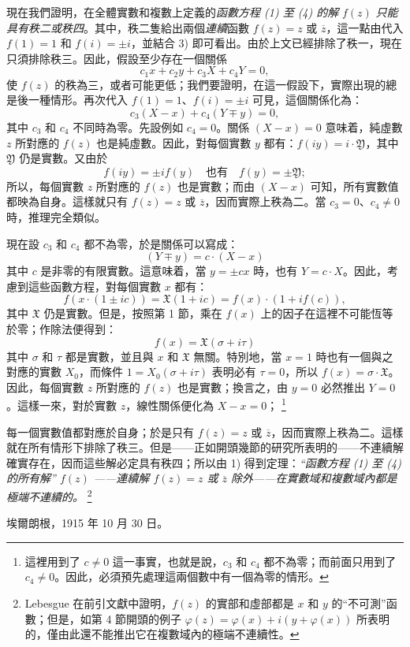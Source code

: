 \documentclass[11pt]{article}
\providecommand{\qtext}[1]{“#1”}
\providecommand{\Xreal}{\mathfrak X}
\providecommand{\Yreal}{\mathfrak Y}
\providecommand{\srcfn}[2]{%
  \begingroup\renewcommand{\thefootnote}{#1}\footnote{#2}\addtocounter{footnote}{-1}\endgroup}
\begin{document}
現在我們證明，在全體實數和複數上定義的\emph{函數方程 (1) 至 (4) 的解} \(f(z)\) \emph{只能具有秩二或秩四}。其中，秩二隻給出兩個\emph{連續}函數 \(f(z)=z\) 或 \(\overline z\)，這一點由代入 \(f(1)=1\) 和 \(f(i)=\pm i\)，並結合 3) 即可看出。由於上文已經排除了秩一，現在只須排除秩三。因此，假設至少存在一個關係
\[
c_1x+c_2y+c_3X+c_4Y=0,
\]
使 \(f(z)\) 的秩為三，或者可能更低；我們要證明，在這一假設下，實際出現的總是後一種情形。再次代入 \(f(1)=1\)、\(f(i)=\pm i\) 可見，這個關係化為：
\[
c_3(X-x)+c_4(Y\mp y)=0,
\]
其中 \(c_3\) 和 \(c_4\) 不同時為零。先設例如 \(c_4=0\)。關係 \((X-x)=0\) 意味着，純虛數 \(z\) 所對應的 \(f(z)\) 也是純虛數。因此，對每個實數 \(y\) 都有：\(f(iy)=i\cdot\Yreal\)，其中 \(\Yreal\) 仍是實數。又由於
\[
f(iy)=\pm i f(y)\quad\text{也有}\quad f(y)=\pm\Yreal;
\]
所以，每個實數 \(z\) 所對應的 \(f(z)\) 也是實數；而由 \((X-x)\) 可知，所有實數值都映為自身。這樣就只有 \(f(z)=z\) 或 \(\overline z\)，因而實際上秩為二。當 \(c_3=0\)、\(c_4\ne0\) 時，推理完全類似。

現在設 \(c_3\) 和 \(c_4\) 都不為零，於是關係可以寫成：
\[
(Y\mp y)=c\cdot(X-x)
\]
其中 \(c\) 是非零的有限實數。這意味着，當 \(y=\pm cx\) 時，也有 \(Y=c\cdot X\)。因此，考慮到這些函數方程，對每個實數 \(x\) 都有：
\[
f(x\cdot(1\pm ic))=\Xreal(1+ic)=f(x)\cdot(1+i f(c)),
\]
其中 \(\Xreal\) 仍是實數。但是，按照第 1 節，乘在 \(f(x)\) 上的因子在這裡不可能恆等於零；作除法便得到：
\[
f(x)=\Xreal(\sigma+i\tau)
\]
其中 \(\sigma\) 和 \(\tau\) 都是實數，並且與 \(x\) 和 \(\Xreal\) 無關。特別地，當 \(x=1\) 時也有一個與之對應的實數 \(X_0\)，而條件 \(1=X_0(\sigma+i\tau)\) 表明必有 \(\tau=0\)，所以 \(f(x)=\sigma\cdot\Xreal\)。因此，每個實數 \(z\) 所對應的 \(f(z)\) 也是實數；換言之，由 \(y=0\) 必然推出 \(Y=0\)。這樣一來，對於實數 \(z\)，線性關係便化為 \(X-x=0\)；\srcfn{*)}{這裡用到了 \(c\ne0\) 這一事實，也就是說，\(c_3\) 和 \(c_4\) 都不為零；而前面只用到了 \(c_4\ne0\)。因此，必須預先處理這兩個數中有一個為零的情形。}每一個實數值都對應於自身；於是只有 \(f(z)=z\) 或 \(\overline z\)，因而實際上秩為二。這樣就在所有情形下排除了秩三。但是——正如開頭幾節的研究所表明的——不連續解確實存在，因而這些解必定具有秩四；所以由 1) 得到定理：\emph{\qtext{函數方程 (1) 至 (4) 的所有解} \(f(z)\) \emph{——連續解} \(f(z)=z\) \emph{或} \(\overline z\) \emph{除外——在實數域和複數域內都是極端不連續的。}}\srcfn{**)}{Lebesgue 在前引文獻中證明，\(f(z)\) 的實部和虛部都是 \(x\) 和 \(y\) 的\qtext{不可測}函數；但是，如第 4 節開頭的例子 \(\varphi(z)=\varphi(x)+i(y+\varphi(x))\) 所表明的，僅由此還不能推出它在複數域內的極端不連續性。}

\medskip
\noindent 埃爾朗根，1915 年 10 月 30 日。


\clearpage
\setcounter{footnote}{0}
\end{document}
